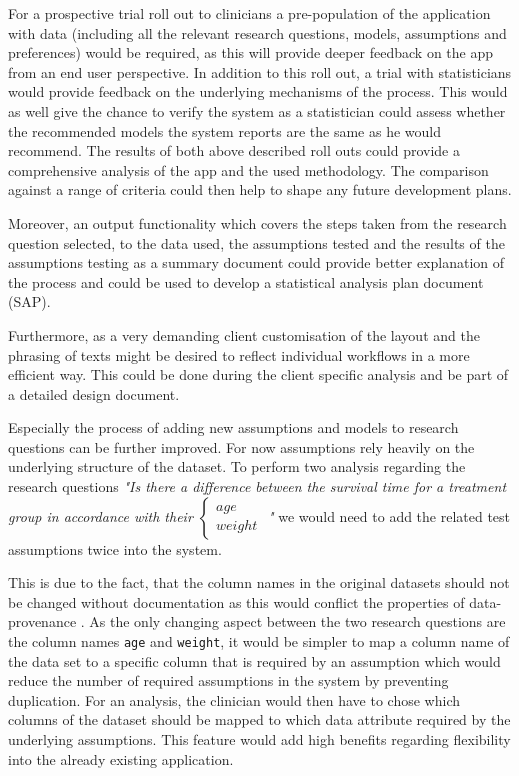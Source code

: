 For a prospective trial roll out to clinicians a pre-population of the application with data (including  all the relevant research questions, models, assumptions and preferences) would be required, as this will provide deeper feedback on the app from an end user perspective. In addition to this roll out, a trial with statisticians would provide feedback on the underlying mechanisms of the process. This would as well give the chance to verify the system as a statistician could assess whether the recommended models the system reports are the same as he would recommend. The results of both above described roll outs could provide a comprehensive analysis of the app and the used methodology. The comparison against a range of criteria could then help to shape any future development plans.

Moreover, an output functionality which covers the steps taken from the research question selected, to the data used, the assumptions tested and the results of the assumptions testing as a summary document could provide better explanation of the process and could be used to develop a statistical analysis plan document (SAP).

Furthermore, as a very demanding client customisation of the layout and the phrasing of texts might be desired to reflect individual workflows in a more efficient way. This could be done during the client specific analysis and be part of a detailed design document.


Especially the process of adding new assumptions and models to research questions can be further improved. For now assumptions rely heavily on the underlying structure of the dataset. To perform two analysis regarding the research questions \textit{"Is there a difference between the survival time for a treatment group in accordance with their {\tiny $\begin{cases} age\\weight \end{cases}$} "} we would need to add the related test assumptions twice into the system. 

This is due to the fact, that the column names in the original datasets should not be changed without documentation as this would conflict the properties of data-provenance \cite{provenance}. As the only changing aspect between the two research questions are the column names \texttt{age} and \texttt{weight}, it would be simpler to map a column name of the data set to a specific column that is required by an assumption which would reduce the number of required assumptions in the system by preventing duplication. For an analysis, the clinician would then have to chose which columns of the dataset should be mapped to which data attribute required by the underlying assumptions. This feature would add high benefits regarding flexibility into the already existing application.
